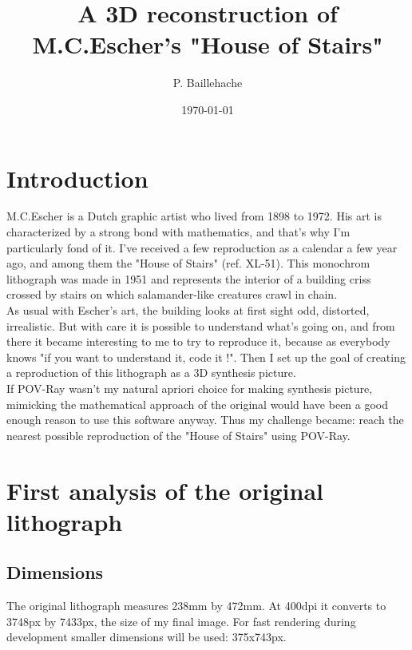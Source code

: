 \documentclass[12pt, a4paper]{article}
\begin{document}
\title{A 3D reconstruction of M.C.Escher's "House of Stairs"}
\author{P. Baillehache}
\date{\today}
\maketitle

\tableofcontents

\section{Introduction}

M.C.Escher is a Dutch graphic artist who lived from 1898 to 1972. His art is characterized by a strong bond with mathematics, and that's why I'm particularly fond of it. I've received a few reproduction as a calendar a few year ago, and among them the "House of Stairs" (ref. XL-51). This monochrom lithograph was made in 1951 and represents the interior of a building criss crossed by stairs on which salamander-like creatures crawl in chain.\\

As usual with Escher's art, the building looks at first sight odd, distorted, irrealistic. But with care it is possible to understand what's going on, and from there it became interesting to me to try to reproduce it, because as everybody knows "if you want to understand it, code it !". Then I set up the goal of creating a reproduction of this lithograph as a 3D synthesis picture.\\

If POV-Ray wasn't my natural apriori choice for making synthesis picture, mimicking the mathematical approach of the original would have been a good enough reason to use this software anyway. Thus my challenge became: reach the nearest possible reproduction of the "House of Stairs" using POV-Ray.\\

\section{First analysis of the original lithograph}

\subsection{Dimensions}

The original lithograph measures 238mm by 472mm. At 400dpi it converts to 3748px by 7433px, the size of my final image. For fast rendering during development smaller dimensions will be used: 375x743px.\\
\end{document}
